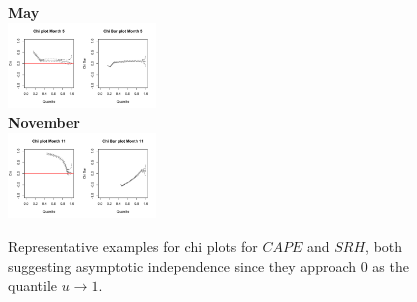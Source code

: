 \documentclass[10pt,conference,compsocconf]{IEEEtran}
\begin{document}
\begin{figure}
	\centering
	\textbf{May}\\
	\includegraphics[width=0.35\textwidth]{../plots/May_chi.pdf}\\
	\textbf{November}\\
	\includegraphics[width=0.35\textwidth]{../plots/November_chi.pdf}
	\caption{Representative examples for chi plots for $CAPE$ and $SRH$, both suggesting asymptotic independence since they approach 0 as the quantile $u \to 1$.}
	\label{fig:cape_srh_chi}
\end{figure}
\end{document}
